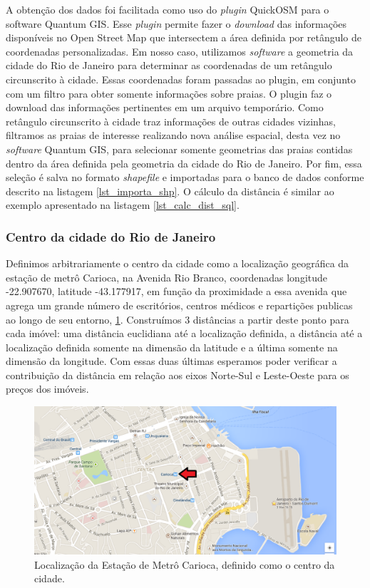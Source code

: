 A obtenção dos dados foi facilitada como uso do \textit{plugin} QuickOSM para o software Quantum GIS. Esse \textit{plugin} permite fazer o \textit{download} das informações disponíveis no Open Street Map que intersectem a área definida por retângulo de coordenadas personalizadas. Em nosso caso, utilizamos \textit{software} a geometria da cidade do Rio de Janeiro para determinar as coordenadas de um retângulo circunscrito à cidade. Essas coordenadas foram passadas ao plugin, em conjunto com um filtro para obter somente informações sobre praias. O plugin faz o  download das informações pertinentes em um arquivo temporário. Como  retângulo circunscrito à cidade traz informações de outras cidades vizinhas, filtramos as praias de interesse realizando nova análise espacial, desta vez no \textit{software} Quantum GIS, para selecionar somente geometrias das praias contidas dentro da área definida pela geometria da cidade do Rio de Janeiro. Por fim, essa seleção é salva no formato \textit{shapefile} e importadas para o banco de dados conforme descrito na listagem \ref{lst_importa_shp}. O cálculo da distância é similar ao exemplo apresentado na listagem \ref{lst_calc_dist_sql}.

\subsubsection{Centro da cidade do Rio de Janeiro} \label{sec:obter_centro_rio}

Definimos arbitrariamente o centro da cidade como a localização geográfica da estação de metrô Carioca, na Avenida Rio Branco, coordenadas longitude -22.907670, latitude -43.177917, em função da proximidade a essa avenida que agrega um grande número de escritórios, centros médicos e repartições publicas ao longo de seu entorno, \cref{fig:loc_metro_carioca}. Construímos 3 distâncias a partir deste ponto para cada imóvel: uma distância euclidiana até a localização definida, a distância até a localização definida somente na dimensão da latitude e a última somente na dimensão da longitude. Com essas duas últimas esperamos poder verificar a contribuição da distância em relação aos eixos Norte-Sul e Leste-Oeste para os preços dos imóveis.

\begin{figure}[h!]
\centering
\includegraphics[width=1\linewidth]{img/loc_metro_carioca}
\caption{Localização da Estação de Metrô Carioca, definido como o centro da cidade.}
\label{fig:loc_metro_carioca}
\end{figure}


